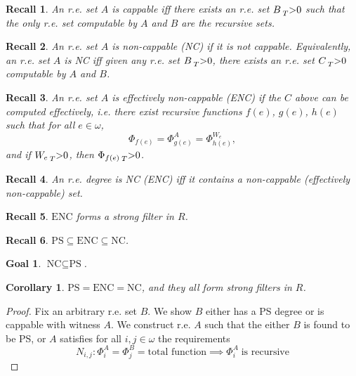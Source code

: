 \documentclass{article}
\newtheorem{recall}{Recall}[subsection]
\newtheorem{goal}{Goal}[subsection]
\newtheorem{corollary}{Corollary}[subsection]
\begin{document}
  \begin{recall}
    An r.e. set $A$ is cappable iff there exists an r.e. set
    $B\prescript{}{T}{>}0$ such that the only r.e. set computable by $A$
    and $B$ are the recursive sets.
  \end{recall}

  \begin{recall}
    An r.e. set $A$ is non-cappable (NC) if it is not cappable.
    Equivalently, an r.e. set $A$ is NC iff given any r.e. set
    $B\prescript{}{T}{>}0$, there exists an r.e. set $C\prescript{}{T}{>}0$
    computable by $A$ and $B$.
  \end{recall}

  \begin{recall}
    An r.e. set $A$ is effectively non-cappable (ENC) if the $C$ above can
    be computed effectively, i.e. there exist recursive functions
    $f(e)$, $g(e)$, $h(e)$ such that for all $e\in\omega$,
    \[\Phi_{f(e)} =\Phi_{g(e)}^A =\Phi_{h(e)}^{W_e},\]
    and if $W_e\prescript{}{T}{>}0$, then $\Phi_{f(e)}\prescript{}{T}{>}0$.
  \end{recall}

  \begin{recall}
    An r.e. degree is NC (ENC) iff it contains a non-cappable (effectively
    non-cappable) set.
  \end{recall}

  \begin{recall}
    $\text{ENC}$ forms a strong filter in $R$.
  \end{recall}

  \begin{recall}
    $\text{PS} \subseteq \text{ENC} \subseteq \text{NC}$.
  \end{recall}

  \begin{goal}
    $\text{NC} \subseteq \text{PS}$.
  \end{goal}

  \begin{corollary}
    $\text{PS}=\text{ENC}=\text{NC}$, and they all form strong filters in
    $R$.
  \end{corollary}

  \begin{proof}
    Fix an arbitrary r.e. set $B$. We show $B$ either has a PS degree or is
    cappable with witness $A$. We construct r.e. $A$ such that the either
    $B$ is found to be PS, or $A$ satisfies for all $i,j\in\omega$ the
    requirements
    \begin{equation}
      N_{i,j}: \Phi_i^A=\Phi_j^B =\text{total function} \implies
      \Phi_i^A\; \text{is recursive}
      \label{eqn:cappable1}
    \end{equation}
  \end{proof}
\end{document}
